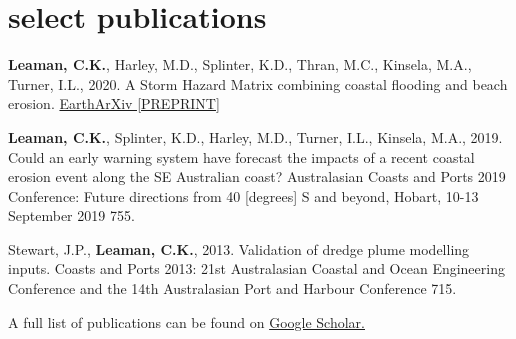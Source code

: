 \section{select publications}
\begin{adjustwidth}{2cm}{}

	\textbf{Leaman, C.K.}, Harley, M.D., Splinter, K.D., Thran, M.C., Kinsela, M.A., Turner, I.L., 2020. A Storm Hazard Matrix combining coastal flooding and beach erosion. \href{https://doi.org/10.31223/X5Q592}{EarthArXiv [PREPRINT]}

	\textbf{Leaman, C.K.}, Splinter, K.D., Harley, M.D., Turner, I.L., Kinsela, M.A., 2019. Could an early warning system have forecast the impacts of a recent coastal erosion event along the SE Australian coast? Australasian Coasts and Ports 2019 Conference: Future directions from 40 [degrees] S and beyond, Hobart, 10-13 September 2019 755.

	Stewart, J.P., \textbf{Leaman, C.K.}, 2013. Validation of dredge plume modelling inputs. Coasts and Ports 2013: 21st Australasian Coastal and Ocean Engineering Conference and the 14th Australasian Port and Harbour Conference 715.

	A full list of publications can be found on \href{https://scholar.google.com/citations?user=LCvsG40AAAAJ&hl=en}{Google Scholar.}

\end{adjustwidth}